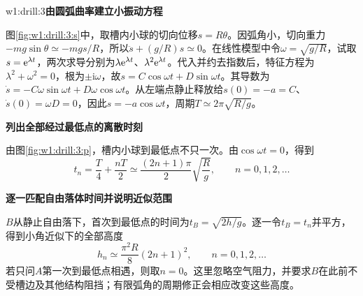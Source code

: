 \begin{drillsolution}{w1:drill:3}\textbf{由圆弧曲率建立小振动方程}\par\nobreak
图\ref{fig:w1:drill:3:s}中，取槽内小球的切向位移$s=R\theta$。因弧角小，切向重力$-mg\sin\theta\simeq-mgs/R$，所以$\ddot s+(g/R)s\simeq0$。在线性模型中令$\omega=\sqrt{g/R}$，试取$s=\mathrm e^{\lambda t}$，两次求导分别为$\lambda\mathrm e^{\lambda t}$、$\lambda^2\mathrm e^{\lambda t}$。代入并约去指数后，特征方程为$\lambda^2+\omega^2=0$，根为$\pm\mathrm i\omega$，故$s=C\cos\omega t+D\sin\omega t$。其导数为$\dot s=-C\omega\sin\omega t+D\omega\cos\omega t$。从左端点静止释放给$s(0)=-a=C$、$\dot s(0)=\omega D=0$，因此$s=-a\cos\omega t$，周期$T\simeq2\pi\sqrt{R/g}$。


\par\medskip{}\noindent\textbf{列出全部经过最低点的离散时刻}\par\nobreak
由图\ref{fig:w1:drill:3:p}，槽内小球到最低点不只一次。由$\cos\omega t=0$，得到
\[
 t_n=\frac T4+\frac{nT}2\simeq\frac{(2n+1)\pi}{2}\sqrt{\frac Rg},\qquad n=0,1,2,\ldots
\]


\par\medskip{}\noindent\textbf{逐一匹配自由落体时间并说明近似范围}\par\nobreak
$B$从静止自由落下，首次到最低点的时间为$t_B=\sqrt{2h/g}$。逐一令$t_B=t_n$并平方，得到小角近似下的全部高度
\[
 \boxed{h_n\simeq\frac{\pi^2R}{8}(2n+1)^2},\qquad n=0,1,2,\ldots
\]
若只问$A$第一次到最低点相遇，则取$n=0$。这里忽略空气阻力，并要求$B$在此前不受槽边及其他结构阻挡；有限弧角的周期修正会相应改变这些高度。
\end{drillsolution}
